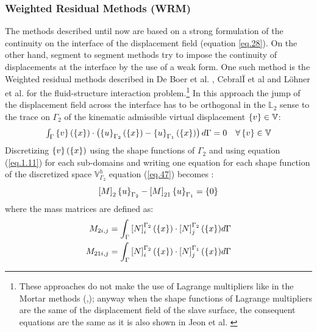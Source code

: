 \subsubsection{Weighted Residual Methods (WRM)}\label{sssec334}
The methods described until now are based on a strong formulation of the continuity on the interface of the displacement field (equation \ref{eq.28}). On the other hand, segment to segment methods try to impose the continuity of displacements at the interface by the use of a weak form. One such method is the Weighted residual methods described in De Boer et al. \cite{de2007review}, Cebral{\=I} et al \cite{cebrali1997conservative} and  L{\"o}hner et al. \cite{lohner1998fluid} for the fluid-structure interaction problem.\footnote{These approaches do not make the use of Lagrange multipliers like in the Mortar methods (\cite{bernardi1989new},\cite{bernardi1993domain}); anyway when the shape functions of Lagrange multipliers are the same of the displacement field of the slave surface, the consequent equations are the same as it is also shown in Jeon et al. \cite{jeong2017element}} In this approach the jump of the displacement field across the interface has to be orthogonal in the $\mathbb{L}_2$ sense to the trace on $\Gamma_2$ of the kinematic admissible virtual displacement $\left\lbrace{v}\right \rbrace \in \mathbb{V}$:
\begin{equation}
\label{eq.47}
\begin{array}{cc}
  \int_{\Gamma}{\left\lbrace{v}\right \rbrace(\left\lbrace{x}\right \rbrace)\cdot\left(\left\lbrace{u}\right \rbrace_{\Gamma_2}(\left\lbrace{x}\right \rbrace)-\left\lbrace{u}\right \rbrace_{\Gamma_1}(\left\lbrace{x}\right \rbrace) \right)d\Gamma}=0 & \forall \left\lbrace{v}\right \rbrace \in \mathbb{V}    
\end{array}
\end{equation}
Discretizing $\left\lbrace{v}\right \rbrace(\left\lbrace{x}\right \rbrace)$ using the shape functions of $\Gamma_2$  and using equation (\ref{eq.1.11}) for each sub-domains and writing one equation for each shape function of the discretized space $\mathbb{V}^h_{\Gamma_2}$ equation (\ref{eq.47}) becomes :
\begin{equation}
\label{eq.48}
\left[{M}\right]_2\left\lbrace{u}\right \rbrace_{\Gamma_2}-\left[{M}\right]_{21}\left\lbrace{u}\right \rbrace_{\Gamma_1}=\left\lbrace{0}\right \rbrace
\end{equation}
where the mass matrices are defined as:
\begin{eqnarray}
\label{eq.49}
M_{2i,j}=\int_{\Gamma}\left[{N}\right]_{i}^{\Gamma_2}(\left\lbrace{x}\right \rbrace)\cdot\left[{N}\right]_{j}^{\Gamma_2}(\left\lbrace{x}\right \rbrace)d\Gamma\\
\label{eq.50}
M_{21i,j}=\int_{\Gamma}\left[{N}\right]_{i}^{\Gamma_2}(\left\lbrace{x}\right \rbrace)\cdot\left[{N}\right]_{j}^{\Gamma_1}(\left\lbrace{x}\right \rbrace)d\Gamma
\end{eqnarray}
